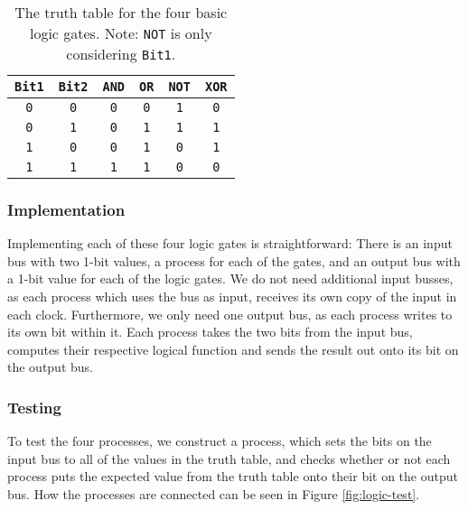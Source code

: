 \begin{table}
    \centering
    \begin{tabular}{cc|cccc}
        \toprule
        \texttt{Bit1} & \texttt{Bit2} & \texttt{AND} & \texttt{OR} &
        \texttt{NOT} & \texttt{XOR} \\
        \midrule
        \texttt{0} & \texttt{0} & \texttt{0} & \texttt{0} & \texttt{1} &
            \texttt{0} \\
        \texttt{0} & \texttt{1} & \texttt{0} & \texttt{1} & \texttt{1} &
            \texttt{1} \\
        \texttt{1} & \texttt{0} & \texttt{0} & \texttt{1} & \texttt{0} &
            \texttt{1} \\
        \texttt{1} & \texttt{1} & \texttt{1} & \texttt{1} & \texttt{0} &
            \texttt{0} \\
        \bottomrule
    \end{tabular}
    \caption{The truth table for the four basic logic gates. Note: \texttt{NOT}
    is only considering \texttt{Bit1}.}
    \label{tab:truth-table}
\end{table}

\subsubsection*{Implementation}
Implementing each of these four logic gates is straightforward: There is an
input bus with two 1-bit values, a process for each of the gates, and an output
bus with a 1-bit value for each of the logic gates. We do not need additional
input busses, as each process which uses the bus as input, receives its own
copy of the input in each clock. Furthermore, we only need one output bus, as
each process writes to its own bit within it. Each process takes the two bits
from the input bus, computes their respective logical function and sends the
result out onto its bit on the output bus.


\subsubsection*{Testing}
To test the four processes, we construct a process, which sets the bits on the
input bus to all of the values in the truth table, and checks whether or not
each process puts the expected value from the truth table onto their bit on the
output bus.  How the processes are connected can be seen in Figure
\ref{fig:logic-test}.

